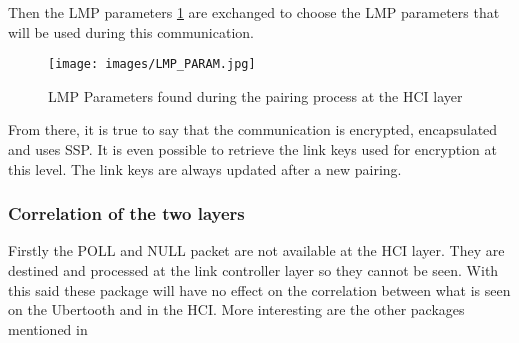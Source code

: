 Then the LMP parameters \ref{fig:lmp} are exchanged to choose the LMP parameters that will be used during this communication. 
\begin{figure}[!h]
  \begin{center}
	\texttt{[image: images/LMP\_PARAM.jpg]}
	\label{fig:lmp}
	\caption{LMP Parameters found during the pairing process at the HCI layer}
  \end{center}
\end{figure}

From there, it is true to say that the communication is encrypted, encapsulated and uses SSP. It is even possible to retrieve the link keys used for encryption at this level. The link keys are always updated after a new pairing.

\subsubsection{Correlation of the two layers}

Firstly the POLL and NULL packet are not available at the HCI layer. They are destined and processed at the link controller layer so they cannot be seen. With this said these package will have no effect on the correlation between what is seen on the Ubertooth and in the HCI. More interesting are the other packages mentioned in 

